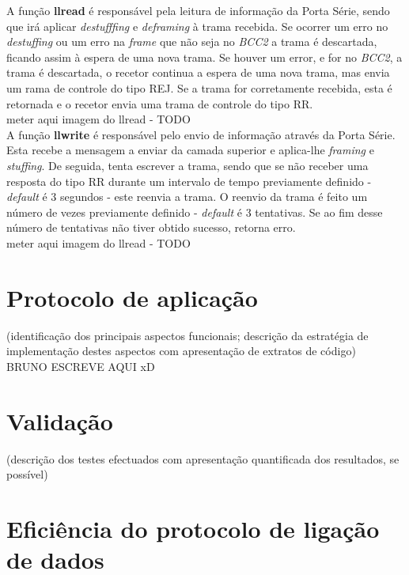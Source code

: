 \documentclass[a4paper, 11pt]{article}
\begin{document}
A função \textbf{llread} é responsável pela leitura de informação da Porta Série, sendo que irá aplicar \textit{destufffing} e \textit{deframing} à trama recebida. Se ocorrer um erro no \textit{destuffing} ou um erro na \textit{frame} que não seja no \textit{BCC2} a trama é descartada, ficando assim à espera de uma nova trama. Se houver um error, e for no \textit{BCC2}, a trama é descartada, o recetor continua a espera de uma nova trama, mas envia um rama de controle do tipo REJ. Se a trama for corretamente recebida, esta é retornada e o recetor envia uma trama de controle do tipo RR.\\
meter aqui imagem do llread - TODO \\

A função \textbf{llwrite} é responsável pelo envio de informação através da Porta Série. Esta recebe a mensagem a enviar da camada superior e aplica-lhe \textit{framing} e \textit{stuffing}.
De seguida, tenta escrever a trama, sendo que se não receber uma resposta do tipo RR durante um intervalo de tempo previamente definido - \textit{default} é 3 segundos - este reenvia a trama. O reenvio da trama é feito um número de vezes previamente definido - \textit{default} é 3 tentativas. Se ao fim desse número de tentativas não tiver obtido sucesso, retorna erro.\\
 meter aqui imagem do llread - TODO \\
 
\newpage

\section{Protocolo de aplicação}

(identificação dos principais aspectos funcionais; descrição da estratégia de implementação destes aspectos com apresentação de extratos de código)\\

BRUNO ESCREVE AQUI xD

\newpage

\section{Validação}

   (descrição dos testes efectuados com apresentação quantificada dos resultados, se possível)
\newpage

\section{Eficiência do protocolo de ligação de dados}
\end{document}
